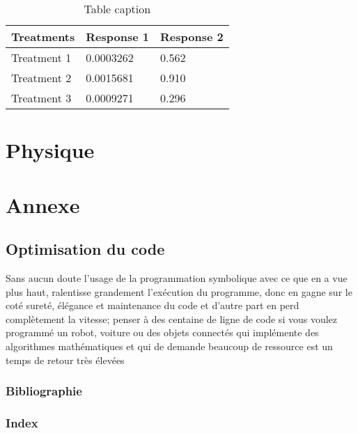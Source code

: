 \documentclass[11pt,fleqn]{book} %
\begin{document}
\begin{table}[h]
\centering
\begin{tabular}{l l l}
\toprule
\textbf{Treatments} & \textbf{Response 1} & \textbf{Response 2}\\
\midrule
Treatment 1 & 0.0003262 & 0.562 \\
Treatment 2 & 0.0015681 & 0.910 \\
Treatment 3 & 0.0009271 & 0.296 \\
\bottomrule
\end{tabular}
\caption{Table caption}
\end{table}

%


\part{Physique}



\part{Annexe}


\chapter{Optimisation du code}
Sans aucun doute l'usage de la programmation symbolique avec ce que en a vue plus haut, ralentisse 
grandement l'exécution du programme, donc en gagne sur le coté sureté, élégance
et maintenance du code et d'autre part en perd complètement la vitesse; penser à des centaine de ligne 
de code si vous voulez programmé un robot, voiture ou des objets connectés qui implémente des 
algorithmes mathématiques et qui de demande beaucoup de ressource est un temps de retour très élevées 




\section{Bibliographie}
\section{Index}
\end{document}

